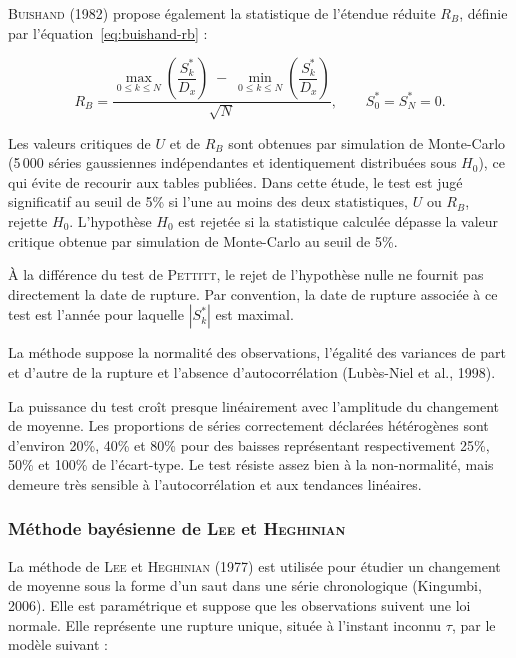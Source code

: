\documentclass[12pt,a4paper]{report}
\begin{document}
\textsc{Buishand} (1982) propose également la statistique de l'étendue réduite $R_B$, définie par l'équation~\eqref{eq:buishand-rb} :

\begin{equation}
R_B = \frac{\displaystyle \max_{0\leq k\leq N}\left(\dfrac{S_k^{*}}{D_x}\right) \;-\; \displaystyle \min_{0\leq k\leq N}\left(\dfrac{S_k^{*}}{D_x}\right)}{\sqrt{N}}, \qquad S_0^{*}=S_N^{*}=0 .
\label{eq:buishand-rb}
\end{equation}

Les valeurs critiques de $U$ et de $R_B$ sont obtenues par simulation de Monte-Carlo (5\,000 séries gaussiennes indépendantes et identiquement distribuées sous $H_0$), ce qui évite de recourir aux tables publiées. Dans cette étude, le test est jugé significatif au seuil de 5\% si l'une au moins des deux statistiques, $U$ ou $R_B$, rejette $H_0$. L'hypothèse $H_0$ est rejetée si la statistique calculée dépasse la valeur critique obtenue par simulation de Monte-Carlo au seuil de 5\%.

À la différence du test de \textsc{Pettitt}, le rejet de l'hypothèse nulle ne fournit pas directement la date de rupture. Par convention, la date de rupture associée à ce test est l'année pour laquelle $|S_k^{*}|$ est maximal.

La méthode suppose la normalité des observations, l'égalité des variances de part et d'autre de la rupture et l'absence d'autocorrélation (Lubès-Niel et al., 1998).

La puissance du test croît presque linéairement avec l'amplitude du changement de moyenne. Les proportions de séries correctement déclarées hétérogènes sont d'environ 20\%, 40\% et 80\% pour des baisses représentant respectivement 25\%, 50\% et 100\% de l'écart-type. Le test résiste assez bien à la non-normalité, mais demeure très sensible à l'autocorrélation et aux tendances linéaires.

\subsubsection{Méthode bayésienne de \textsc{Lee} et \textsc{Heghinian}}

La méthode de \textsc{Lee} et \textsc{Heghinian} (1977) est utilisée pour étudier un changement de moyenne sous la forme d'un saut dans une série chronologique (Kingumbi, 2006). Elle est paramétrique et suppose que les observations suivent une loi normale. Elle représente une rupture unique, située à l'instant inconnu $\tau$, par le modèle suivant :
\end{document}
